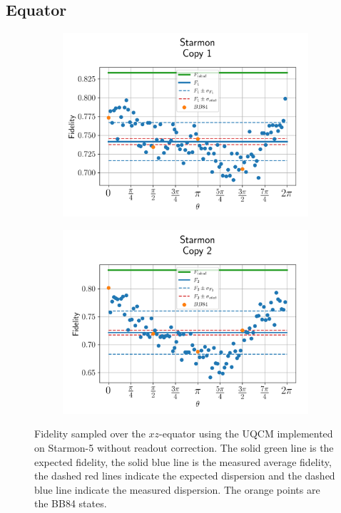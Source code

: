 \subsection{Equator}
\begin{figure}[H]
    \centering
    \begin{subfigure}{.45\textwidth}
      \centering
      \includegraphics[width=\textwidth]{Figures/UQCM/Starmon/OnlyEquator/results_starmon5_copy1.png}
    \end{subfigure}%
    \begin{subfigure}{.45\textwidth}
      \centering
      \includegraphics[width=\textwidth]{Figures/UQCM/Starmon/OnlyEquator/results_starmon5_copy2.png}
    \end{subfigure}
    \caption{Fidelity sampled over the $xz$-equator using the UQCM implemented on Starmon-5 without readout correction. The solid green line is the expected fidelity, the solid blue line is the measured average fidelity, the dashed red lines indicate the expected dispersion and the dashed blue line indicate the measured dispersion. The orange points are the BB84 states.}
\end{figure}


